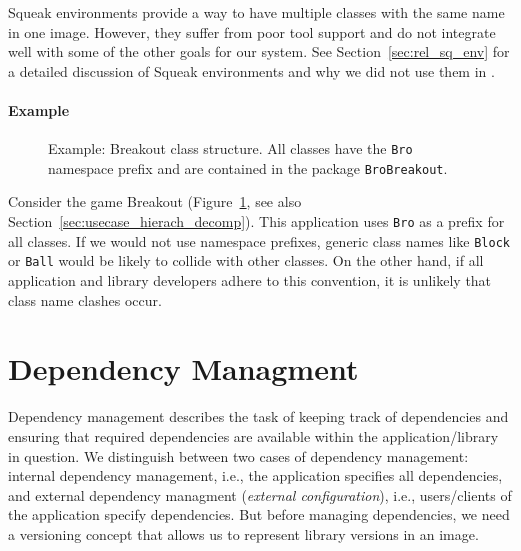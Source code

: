 Squeak environments provide a way to have multiple classes with the same name in one image. However, they suffer from poor tool support and do not integrate well with some of the other goals for our system. See Section~\ref{sec:rel_sq_env} for a detailed discussion of Squeak environments and why we did not use them in \msname.

\paragraph{Example}
\begin{figure}[!htp]
\caption[Example: Breakout class structure]{Example: Breakout class structure. All classes have the \texttt{Bro} namespace prefix and are contained in the package \texttt{BroBreakout}.}
\label{fig:conc_breakout}
\end{figure}

Consider the game Breakout (Figure~\ref{fig:conc_breakout}, see also Section~\ref{sec:usecase_hierach_decomp}). This application uses \texttt{Bro} as a prefix for all classes. If we would not use namespace prefixes, generic class names like \texttt{Block} or \texttt{Ball} would be likely to collide with other classes. On the other hand, if all application and library developers adhere to this convention, it is unlikely that class name clashes occur.

\section{Dependency Managment}
Dependency management describes the task of keeping track of dependencies and ensuring that required dependencies are available within the application/library in question. We distinguish between two cases of dependency management: internal dependency management, i.e., the application specifies all dependencies, and external dependency managment (\emph{external configuration}), i.e., users/clients of the application specify dependencies. But before managing dependencies, we need a versioning concept that allows us to represent library versions in an image.

